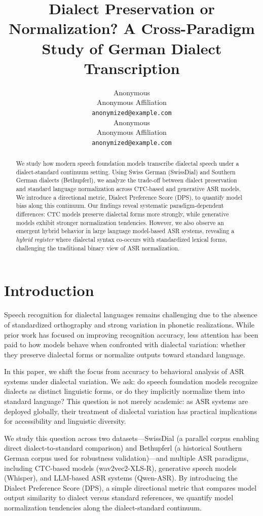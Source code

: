 \documentclass[11pt]{article}
\title{Dialect Preservation or Normalization?
A Cross-Paradigm Study of German Dialect Transcription}
\author{Anonymous \\
  Anonymous Affiliation \\
  \texttt{anonymized@example.com} \\\And
  Anonymous \\
  Anonymous Affiliation \\
  \texttt{anonymized@example.com} \\}
\begin{document}
\maketitle

\begin{abstract}
We study how modern speech foundation models transcribe dialectal speech under a dialect-standard continuum setting. Using Swiss German (SwissDial) and Southern German dialects (Bethupferl), we analyze the trade-off between dialect preservation and standard language normalization across CTC-based and generative ASR models. We introduce a directional metric, Dialect Preference Score (DPS), to quantify model bias along this continuum. Our findings reveal systematic paradigm-dependent differences: CTC models preserve dialectal forms more strongly, while generative models exhibit stronger normalization tendencies. However, we also observe an emergent hybrid behavior in large language model-based ASR systems, revealing a \textit{hybrid register} where dialectal syntax co-occurs with standardized lexical forms, challenging the traditional binary view of ASR normalization.
\end{abstract}

\section{Introduction}

Speech recognition for dialectal languages remains challenging due to the absence of standardized orthography and strong variation in phonetic realizations. While prior work has focused on improving recognition accuracy, less attention has been paid to how models behave when confronted with dialectal variation: whether they preserve dialectal forms or normalize outputs toward standard language.

In this paper, we shift the focus from accuracy to behavioral analysis of ASR systems under dialectal variation. We ask: do speech foundation models recognize dialects as distinct linguistic forms, or do they implicitly normalize them into standard language? This question is not merely academic: as ASR systems are deployed globally, their treatment of dialectal variation has practical implications for accessibility and linguistic diversity.

We study this question across two datasets—SwissDial (a parallel corpus enabling direct dialect-to-standard comparison) and Bethupferl (a historical Southern German corpus used for robustness validation)—and multiple ASR paradigms, including CTC-based models (wav2vec2-XLS-R), generative speech models (Whisper), and LLM-based ASR systems (Qwen-ASR). By introducing the Dialect Preference Score (DPS), a simple directional metric that compares model output similarity to dialect versus standard references, we quantify model normalization tendencies along the dialect-standard continuum.
\end{document}
